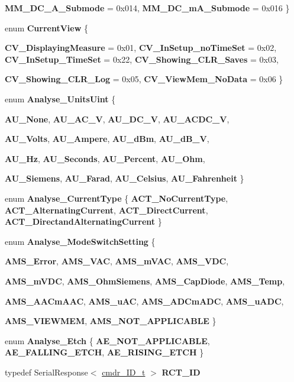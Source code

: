\begin{DoxyCompactItemize}
{\bfseries MM\_\-DC\_\-A\_\-Submode} = 0x014, 
{\bfseries MM\_\-DC\_\-mA\_\-Submode} = 0x016
 \}
\item 
enum {\bfseries CurrentView} \{ \par
{\bfseries CV\_\-DisplayingMeasure} = 0x01, 
{\bfseries CV\_\-InSetup\_\-noTimeSet} = 0x02, 
{\bfseries CV\_\-InSetup\_\-TimeSet} = 0x22, 
{\bfseries CV\_\-Showing\_\-CLR\_\-Saves} = 0x03, 
\par
{\bfseries CV\_\-Showing\_\-CLR\_\-Log} = 0x05, 
{\bfseries CV\_\-ViewMem\_\-NoData} = 0x06
 \}
\item 
enum {\bfseries Analyse\_\-UnitsUint} \{ \par
{\bfseries AU\_\-None}, 
{\bfseries AU\_\-AC\_\-V}, 
{\bfseries AU\_\-DC\_\-V}, 
{\bfseries AU\_\-ACDC\_\-V}, 
\par
{\bfseries AU\_\-Volts}, 
{\bfseries AU\_\-Ampere}, 
{\bfseries AU\_\-dBm}, 
{\bfseries AU\_\-dB\_\-V}, 
\par
{\bfseries AU\_\-Hz}, 
{\bfseries AU\_\-Seconds}, 
{\bfseries AU\_\-Percent}, 
{\bfseries AU\_\-Ohm}, 
\par
{\bfseries AU\_\-Siemens}, 
{\bfseries AU\_\-Farad}, 
{\bfseries AU\_\-Celsius}, 
{\bfseries AU\_\-Fahrenheit}
 \}
\item 
enum {\bfseries Analyse\_\-CurrentType} \{ {\bfseries ACT\_\-NoCurrentType}, 
{\bfseries ACT\_\-AlternatingCurrent}, 
{\bfseries ACT\_\-DirectCurrent}, 
{\bfseries ACT\_\-DirectandAlternatingCurrent}
 \}
\item 
enum {\bfseries Analyse\_\-ModeSwitchSetting} \{ \par
{\bfseries AMS\_\-Error}, 
{\bfseries AMS\_\-VAC}, 
{\bfseries AMS\_\-mVAC}, 
{\bfseries AMS\_\-VDC}, 
\par
{\bfseries AMS\_\-mVDC}, 
{\bfseries AMS\_\-OhmSiemens}, 
{\bfseries AMS\_\-CapDiode}, 
{\bfseries AMS\_\-Temp}, 
\par
{\bfseries AMS\_\-AACmAAC}, 
{\bfseries AMS\_\-uAC}, 
{\bfseries AMS\_\-ADCmADC}, 
{\bfseries AMS\_\-uADC}, 
\par
{\bfseries AMS\_\-VIEWMEM}, 
{\bfseries AMS\_\-NOT\_\-APPLICABLE}
 \}
\item 
enum {\bfseries Analyse\_\-Etch} \{ {\bfseries AE\_\-NOT\_\-APPLICABLE}, 
{\bfseries AE\_\-FALLING\_\-ETCH}, 
{\bfseries AE\_\-RISING\_\-ETCH}
 \}
\item 
\hypertarget{classFluke_1_1Fluke189_a07788d6f33a7dd54b3a66373b5addded}{
typedef SerialResponse$<$ \hyperlink{structFluke_1_1Fluke189_1_1cmdr__ID__t}{cmdr\_\-ID\_\-t} $>$ {\bfseries RCT\_\-ID}}
\label{classFluke_1_1Fluke189_a07788d6f33a7dd54b3a66373b5addded}


\end{DoxyCompactItemize}
